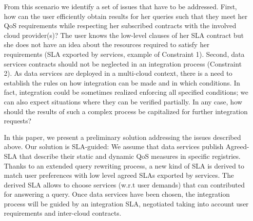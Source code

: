 

  From this scenario we identify a set of issues that have to be addressed. First, how can the user efficiently obtain  results for her queries such that they meet her QoS requirements while respecting her subscribed contracts with the involved cloud provider(s)?  The user knows the low-level clauses of her SLA contract but she does not have an idea about the resources required to satisfy her requirements (SLA exported by services, example of Constraint 1).  Second, data services contracts should not be neglected in an integration process (Constraint 2).   As data services are deployed in a multi-cloud context, there is a need to establish the rules on how integration can be made and in which conditions. In fact, integration could be sometimes realized enforcing all specified conditions; we can also expect situations where they can be verified partially. In any case, how should the results of  such a  complex process  be capitalized for further integration requests?
  
 In this paper, we present  a preliminary solution addressing the issues described above.  Our solution is SLA-guided: We assume that data services publish Agreed-SLA that describe their  static and dynamic QoS measures in specific registries.  Thanks to an extended query rewriting process, a new kind of SLA is derived to match user preferences with low level agreed SLAs exported by services. The derived SLA allows to choose  services (w.r.t user demands) that can contributed for answering a query. Once data services have been chosen, the integration process will be guided by an integration SLA, negotiated taking into account user requirements and inter-cloud contracts.


